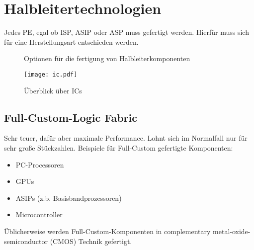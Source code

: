 \chapter{Halbleitertechnologien}
Jedes PE, egal ob ISP, ASIP oder ASP muss gefertigt werden. Hierfür muss sich für eine Herstellungsart entschieden werden.
\begin{figure}[H]
    \centering
    \caption{Optionen für die fertigung von Halbleiterkomponenten}
\end{figure}

\begin{figure}[H]
    \centering
    \texttt{[image: ic.pdf]}
    \caption{Überblick über ICs}
\end{figure}

\section{Full-Custom-Logic Fabric}
Sehr teuer, dafür aber maximale Performance. 
Lohnt sich im Normalfall nur für sehr große Stückzahlen.
Beispiele für Full-Custom gefertigte Komponenten:
\begin{itemize}
    \item PC-Processoren
    \item GPUs
    \item ASIPs (z.b. Basisbandprozessoren)
    \item Microcontroller
\end{itemize}

Üblicherweise werden Full-Custom-Komponenten in \glqq{}complementary metal-oxide-semiconductor\grqq{} (CMOS) Technik gefertigt.

